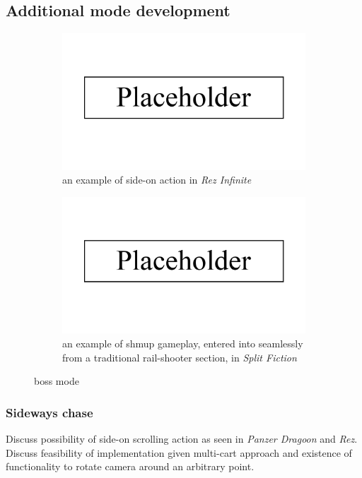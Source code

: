 \documentclass{article}
\begin{document}
\subsection{Additional mode development}

\begin{figure}[h]
\begin{subfigure}{.45\textwidth}
  \centering
  \includegraphics[width=.8\linewidth]{placeholder}
  \caption{an example of side-on action in \textit{Rez Infinite}}
  \label{fig:sideways}
\end{subfigure}\hfill
\begin{subfigure}{.45\textwidth}
  \centering
  \includegraphics[width=.8\linewidth]{placeholder}
  \caption{an example of shmup gameplay, entered into seamlessly from a traditional rail-shooter section, in \textit{Split Fiction}}
  \label{fig:shmup}
\end{subfigure}\hfill
\caption{boss mode}
\label{fig:additionalmodes}
\end{figure}

\subsubsection*{Sideways chase}
Discuss possibility of side-on scrolling action as seen in \textit{Panzer Dragoon} and \textit{Rez}.
Discuss feasibility of implementation given multi-cart approach and existence of functionality to
rotate camera around an arbitrary point.
\end{document}
